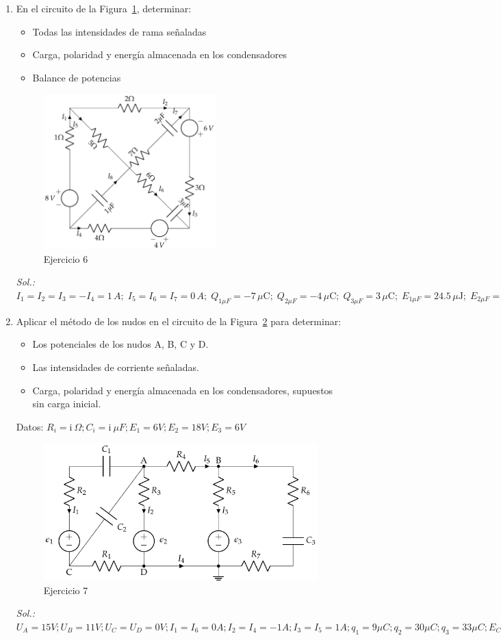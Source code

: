 \begin{enumerate}
\item En el circuito de la Figura~\ref{fig.ej9_BT1}, determinar:
\begin{itemize}
    \item Todas las intensidades de rama señaladas
    \item Carga, polaridad y energía almacenada en los condensadores
    \item Balance de potencias
\end{itemize}
\begin{figure}[H]
    \centering
    \includegraphics[height=6cm]{../figs/ej9_BT1.pdf}
    \caption{Ejercicio 6}
    \label{fig.ej9_BT1}
\end{figure}
\emph{Sol.: $I_1=I_2=I_3=-I_4=1\,A;\; I_5=I_6=I_7=0\,A;\;Q_{1\mu F}=-7\,\mu\text{C};\;Q_{2\mu F}=-4\,\mu\text{C};\;Q_{3\mu F}=3\,\mu\text{C};\;E_{1\mu F}=24.5\,\mu\text{J};\;E_{2\mu F}=4\,\mu\text{J};\; E_{3\mu F}=1.5\,\mu\text{J}$}
\item Aplicar el método de los nudos en el circuito de la Figura~\ref{fig.nudos_condensadores} para determinar:
\begin{itemize}
\item Los potenciales de los nudos A, B, C y D.
\item Las intensidades de corriente señaladas.
\item Carga, polaridad y energía almacenada en los condensadores, supuestos sin carga inicial.
\end{itemize}
Datos: $R_i = \mathrm{i\ } \Omega; C_i = \mathrm{i\ } \mu F; E_1 = 6V; E_2 = 18 V; E_3 = {6} V$
\begin{figure}[H]
    \centering
    \includegraphics[]{../figs/nudos_condensadores.pdf}
    \caption{Ejercicio 7}
    \label{fig.nudos_condensadores}
\end{figure}
\emph{Sol.: $U_A=15V; U_B=11V; U_C=U_D=0V; I_1=I_6=0A;I_2=I_4=-1A; I_3=I_5=1A; q_1=9\mu C; q_2=30\mu C; q_3=33\mu C; E_{C1}=40.5\mu J; E_{C2}=225\mu J;E_{C2}=181.5\mu J$}


\end{enumerate}

